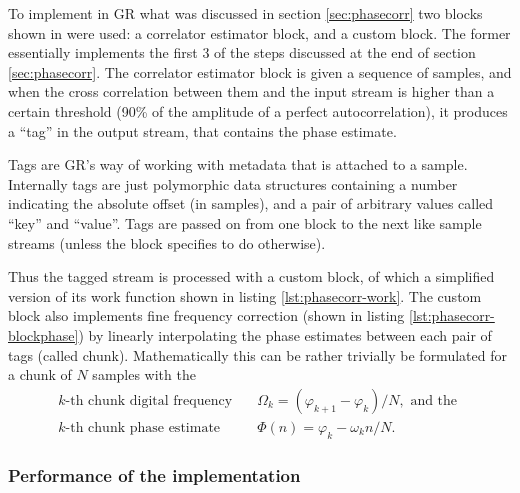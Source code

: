To implement in GR what was discussed in section \ref{sec:phasecorr} two blocks shown in  were used: a correlator estimator block, and a custom block. The former essentially implements the first 3 of the steps discussed at the end of section \ref{sec:phasecorr}. The correlator estimator block is given a sequence of samples, and when the cross correlation between them and the input stream is higher than a certain threshold (90\% of the amplitude of a perfect autocorrelation), it produces a ``tag'' in the output stream, that contains the phase estimate.

Tags are GR's way of working with metadata that is attached to a sample. Internally tags are just polymorphic data structures containing a number indicating the absolute offset (in samples), and a pair of arbitrary values called ``key'' and ``value''. Tags are passed on from one block to the next like sample streams (unless the block specifies to do otherwise).

Thus the tagged stream is processed with a custom block, of which a simplified version of its work function shown in listing \ref{lst:phasecorr-work}. The custom block also implements fine frequency correction (shown in listing \ref{lst:phasecorr-blockphase}) by linearly interpolating the phase estimates between each pair of tags (called chunk). Mathematically this can be rather trivially be formulated for a chunk of \(N\) samples with the
\begin{subequations}
	\begin{align}
		k\text{-th chunk digital frequency} \quad  & \Omega_k = (\varphi_{k+1} - \varphi_k) / N, \text{ and the }\\
		k\text{-th chunk phase estimate} \quad & \Phi(n) = \varphi_k - \omega_k n/N.
	\end{align}
\end{subequations}

\subsubsection{Performance of the implementation}\label{sec:preforming-implementation}

